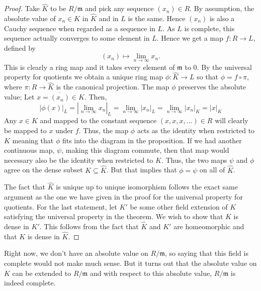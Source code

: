 \documentclass{article}
\newcommand{\mfrak}[1]{\mathfrak{#1}}
\begin{document}
\begin{proof}   
    Take $\hat K$ to be $R / \mfrak m$ and pick any sequence $(x_n) \in R$. By assumption, the absolute value of $x_n \in K$ in $\hat K$ and in $L$ is the same. Hence $(x_n)$ is also a Cauchy sequence when regarded as a sequence in $L$. As $L$ is complete, this sequence actually converges to some element in $L$. Hence we get a map $f : R \to L$, defined by 
    $$(x_n) \mapsto \lim_{n \to \infty} x_n.$$
    This is clearly a ring map and it takes every element of $\mfrak m$ to 0. By the universal property for quotients we obtain a unique ring map $\phi : \hat K \to L$ so that $\phi = f \circ \pi$, where $\pi : R \to \hat K$ is the canonical projection. The map $\phi$ preserves the absolute value; Let $x = \overline {(x_n)} \in \hat K$. Then, 
    $$|\phi(x)|_L = |\lim_{n \to \infty} x_n|_L = \lim_{n \to \infty} |x_n|_L = \lim_{n \to \infty} |x_n|_K = |x|_K$$    
    Any $x \in K$ and mapped to the constant sequence $(x,x,x, ...) \in R$ will clearly be mapped to $x$ under $f$. Thus, the map $\phi$ acts as the identity when restricted to $K$ meaning that $\phi$ fits into the diagram in the proposition. If we had another continuous map, $\psi$, making this diagram commute, then that map would necessary also be the identity when restricted to $K$. Thus, the two maps $\psi$ and $\phi$ agree on the dense subset $K \subseteq \hat K$. But that implies that $\phi = \psi$ on all of $\hat K$. 
    
     
    

    The fact that $\hat K$ is unique up to unique isomorphism follows the exact same argument as the one we have given in the proof for the universal property for quotients. For the last statement, let $K'$ be some other field extension of $K$ satisfying the universal property in the theorem. We wish to show that $K$ is dense in $K'$. This follows from the fact that $\hat K$ and $K'$ are homeomorphic and that $K$ is dense in $\hat K$.
\end{proof}



Right now, we don't have an absolute value on $R / \mfrak m$, so saying that this field is complete would not make much sense. But it turns out that the absolute value on $K$ can be extended to $R / \mfrak m$ and with respect to this absolute value, $R / \mfrak m$ is indeed complete.
\end{document}
